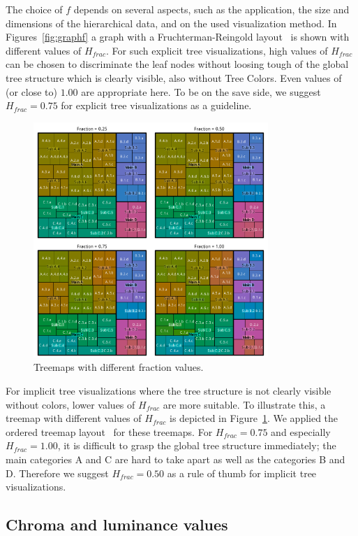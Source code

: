 \documentclass[journal]{vgtc}                %
\begin{document}
The choice of $f$ depends on several aspects, such as the application, the size and dimensions of the hierarchical data, and on the used visualization method. In Figures~\ref{fig:graphf} a graph with a Fruchterman-Reingold layout~\cite{Fruchterman91} is shown with different values of $H_{frac}$. For such explicit tree visualizations, high values of $H_{frac}$ can be chosen to discriminate the leaf nodes without loosing tough of the global tree structure which is clearly visible, also without Tree Colors. Even values of (or close to) $1.00$ are appropriate here. To be on the save side, we suggest $H_{frac}=0.75$ for explicit tree visualizations as a guideline.

\begin{figure}[htb]
  \centering
  \includegraphics[width=3.5in]{Treemaps_hue.pdf}
  \caption{Treemaps with different fraction values.}\label{fig:treemapf}
\end{figure}


For implicit tree visualizations where the tree structure is not clearly visible without colors, lower values of $H_{frac}$ are more suitable. To illustrate this, a treemap with different values of $H_{frac}$ is depicted in Figure~\ref{fig:treemapf}. We applied the ordered treemap layout~\cite{Bederson2002} for these treemaps. For $H_{frac}=0.75$ and especially $H_{frac}=1.00$, it is difficult to grasp the global tree structure immediately; the main categories A and C are hard to take apart as well as the categories B and D. Therefore we suggest $H_{frac}=0.50$ as a rule of thumb for implicit tree visualizations.


\subsection{Chroma and luminance values}
\end{document}
